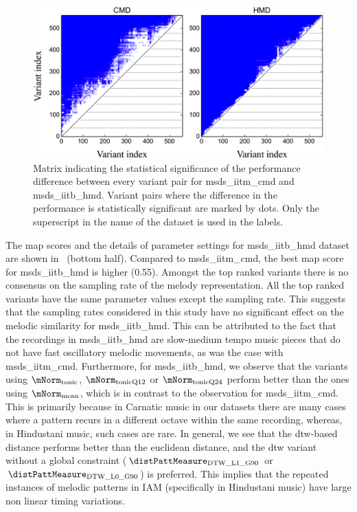 \begin{figure}
	\begin{center}
		\includegraphics[width=\figSizeEightyFive]{ch06_patterns/figures/SimilarityEvaluation/StatisticalDiff.png}
	\end{center}
	\caption{Matrix indicating the statistical significance of the performance difference between every variant pair for \acrshort{msds_iitm_cmd} and \acrshort{msds_iitb_hmd}. Variant pairs where the difference in the performance is statistically significant are marked by dots. Only the superscript in the name of the dataset is used in the labels.}
	\label{fig:patterns_statistical_significance_similarity_evaluation}
\end{figure}


The \gls{map} scores and the details of parameter settings for \acrshort{msds_iitb_hmd} dataset are shown in~ (bottom half). Compared to \acrshort{msds_iitm_cmd}, the best \gls{map} score for \acrshort{msds_iitb_hmd} is higher (0.55). Amongst the top ranked variants there is no consensus on the sampling rate of the melody representation. All the top ranked variants have the same parameter values except the sampling rate. This suggests that the sampling rates considered in this study have no significant effect on the melodic similarity for \acrshort{msds_iitb_hmd}. This can be attributed to the fact that the recordings in \acrshort{msds_iitb_hmd} are slow-medium tempo music pieces that do not have fast oscillatory melodic movements, as was the case with \acrshort{msds_iitm_cmd}.  Furthermore, for \acrshort{msds_iitb_hmd}, we observe that the variants using $\mNorm_{\mathrm{tonic}}$, $\mNorm_{\mathrm{tonicQ12}}$ or $\mNorm_{\mathrm{tonicQ24}}$ perform better than the ones using $\mNorm_{\mathrm{mean}}$, which is in contrast to the observation for \acrshort{msds_iitm_cmd}. This is primarily because in Carnatic music in our datasets there are many cases where a pattern recurs in a different octave within the same recording, whereas, in Hindustani music, such cases are rare. In general, we see that the \gls{dtw}-based distance performs better than the euclidean distance, and the \gls{dtw} variant without a global constraint ($\distPattMeasure_{\mathrm{DTW\_L1\_G90}}$ or $\distPattMeasure_{\mathrm{DTW\_L0\_G90}}$) is preferred. This implies that the repeated instances of melodic patterns in IAM (specifically in Hindustani music) have large non linear timing variations.

